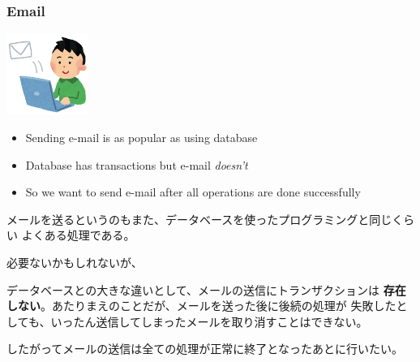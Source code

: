 \begin{frame}
  \frametitle{Email}

  \begin{flushright}
    \includegraphics[width=0.2\textwidth]{./img/computer_mail.png}
  \end{flushright}

  \pause
  \begin{itemize}
    \item<+-> Sending e-mail is as popular as using database

    \item<+-> Database has transactions but e-mail \emph{doesn't}

    \item<+-> So we want to send e-mail after all operations
    are done successfully
  \end{itemize}

  \begin{notes}
    \item メールを送るというのもまた、データベースを使ったプログラミングと同じくらい
    よくある処理である。

    \item 必要ないかもしれないが、

    \item データベースとの大きな違いとして、メールの送信にトランザクションは
    \textbf{存在しない}。あたりまえのことだが、メールを送った後に後続の処理が
    失敗したとしても、いったん送信してしまったメールを取り消すことはできない。

    \item したがってメールの送信は全ての処理が正常に終了となったあとに行いたい。
  \end{notes}
\end{frame}

